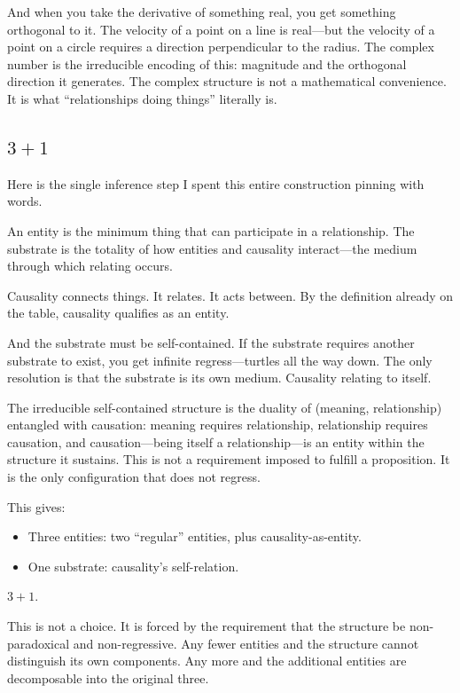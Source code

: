 \documentclass[11pt,a4paper]{article}
\theoremstyle{definition}
\theoremstyle{remark}
\begin{document}
And when you take the derivative of something real, you get something orthogonal to it. The velocity of a point on a line is real---but the velocity of a point on a circle requires a direction perpendicular to the radius. The complex number is the irreducible encoding of this: magnitude and the orthogonal direction it generates. The complex structure is not a mathematical convenience. It is what ``relationships doing things'' literally is.

\subsection*{$3+1$}

Here is the single inference step I spent this entire construction pinning with words.

An entity is the minimum thing that can participate in a relationship. The substrate is the totality of how entities and causality interact---the medium through which relating occurs.

Causality connects things. It relates. It acts between. By the definition already on the table, causality qualifies as an entity.

And the substrate must be self-contained. If the substrate requires another substrate to exist, you get infinite regress---turtles all the way down. The only resolution is that the substrate is its own medium. Causality relating to itself.

The irreducible self-contained structure is the duality of (meaning, relationship) entangled with causation: meaning requires relationship, relationship requires causation, and causation---being itself a relationship---is an entity within the structure it sustains. This is not a requirement imposed to fulfill a proposition. It is the only configuration that does not regress.

This gives:
\begin{itemize}[nosep]
\item Three entities: two ``regular'' entities, plus causality-as-entity.
\item One substrate: causality's self-relation.
\end{itemize}

$3+1$.

This is not a choice. It is forced by the requirement that the structure be non-paradoxical and non-regressive. Any fewer entities and the structure cannot distinguish its own components. Any more and the additional entities are decomposable into the original three.
\end{document}
